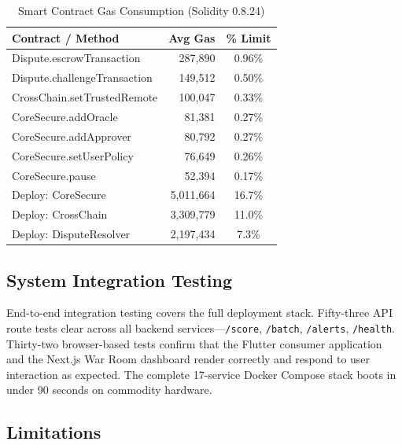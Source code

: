 \documentclass[journal]{IEEEtran}
\begin{document}
\begin{table}[!t]
\centering
\caption{Smart Contract Gas Consumption (Solidity 0.8.24)}
\label{tab:gas}
\begin{tabular}{lrc}
\toprule
\textbf{Contract / Method} & \textbf{Avg Gas} & \textbf{\% Limit} \\
\midrule
Dispute.escrowTransaction     & 287,890   & 0.96\% \\
Dispute.challengeTransaction  & 149,512   & 0.50\% \\
CrossChain.setTrustedRemote   & 100,047   & 0.33\% \\
CoreSecure.addOracle          &  81,381   & 0.27\% \\
CoreSecure.addApprover        &  80,792   & 0.27\% \\
CoreSecure.setUserPolicy      &  76,649   & 0.26\% \\
CoreSecure.pause              &  52,394   & 0.17\% \\
\midrule
Deploy: CoreSecure            & 5,011,664 & 16.7\% \\
Deploy: CrossChain            & 3,309,779 & 11.0\% \\
Deploy: DisputeResolver       & 2,197,434 &  7.3\% \\
\bottomrule
\end{tabular}
\end{table}

\subsection{System Integration Testing}

End-to-end integration testing covers the full deployment stack. Fifty-three API route tests clear across all backend services---\texttt{/score}, \texttt{/batch}, \texttt{/alerts}, \texttt{/health}. Thirty-two browser-based tests confirm that the Flutter consumer application and the Next.js War Room dashboard render correctly and respond to user interaction as expected. The complete 17-service Docker Compose stack boots in under 90 seconds on commodity hardware.

\subsection{Limitations}
\end{document}
